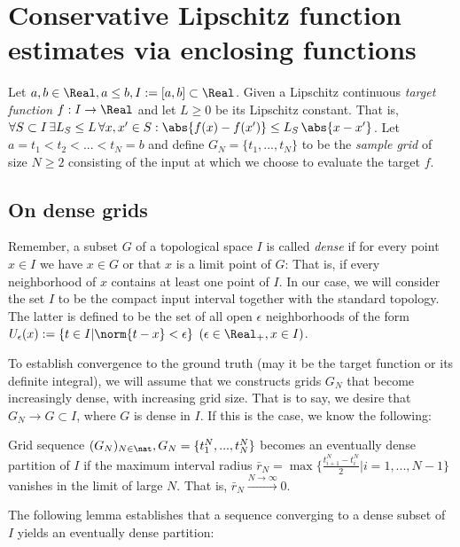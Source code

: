 \section{Conservative Lipschitz function estimates via enclosing functions }

Let $a,b \in \Real, a \leq b, I := [a,b] \subset \Real$. Given a
Lipschitz continuous \emph{target function} $f: I \to \Real $ and
let $L \geq 0$ be its Lipschitz constant. That is, $\forall S
\subset I \,\exists L_S \leq L \,\forall x,x' \in S: \abs{f(x) -
f(x')} \leq L_S \, \abs{x-x'}$. Let $a = t_1 < t_2 <...<t_N = b $
and define $G_N = \{ t_1,...,t_N\}$ to be the \emph{sample grid} of
size $N \geq 2$ consisting of the input at which we choose to evaluate the
target $f$.

\subsection{On dense grids}
Remember, a subset $G$ of a topological space $I$ is called \textit{dense} if for every point $x \in I$ we have $x \in G$ or that $x$ is a limit point of $G$: That is, if every neighborhood of $x$ contains at least one point of $I$.
In our case, we will consider the set $I$ to be the compact input interval together with the standard topology. The latter is defined to be the set of all open $\epsilon$ neighborhoods of the form $U_\epsilon (x) := \{t \in I | \norm{t - x} < \epsilon \}$ $(\epsilon \in \Real_+, x \in I)$.

To establish convergence to the ground truth (may it be the target function or its definite integral), we will assume that we constructs grids $G_N$ that become increasingly dense, with increasing grid size. That is to say, we desire that $G_N \to G \subset I$, where $G$ is dense in $I$.
If this is the case, we know the following:

\begin{defn}
Grid sequence $(G_N)_{N \in \nat}, G_N = \{t_1^N,...,t_N^N \}$ becomes an eventually dense partition of $I$ if the maximum interval radius $\bar r_N = \max\{\frac{t^{N}_{i+1} - t^{N}_{i}}{2} | i=1,...,N-1 \}$
vanishes in the limit of large $N$. That is, $\bar r_N \stackrel{N \to \infty}{\longrightarrow} 0$. 
\end{defn}

The following lemma establishes that a sequence converging to a dense subset of $I$ yields an eventually dense partition:

